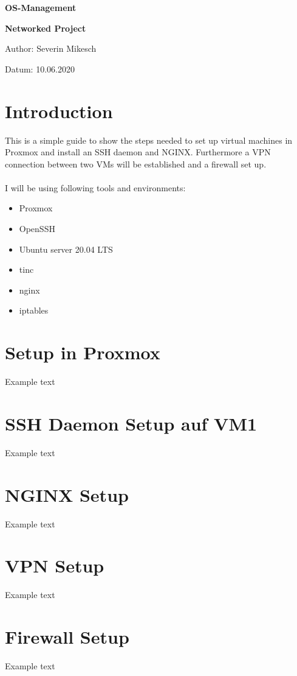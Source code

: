 \documentclass[10pt,a4paper]{article}
\begin{document}
\huge
\begin{center}
{\bf OS-Management}\par
{\bf Networked Project}\par
\vspace{5cm}
\end{center}

\large
Author: Severin Mikesch\par
\vspace{0.8cm}
Datum: 10.06.2020\par
\vspace{0.8cm}

\normalsize


\newpage
\section{Introduction}
This is a simple guide to show the steps needed to set up virtual machines in Proxmox and install an SSH daemon and NGINX. Furthermore a VPN connection between two VMs will be established and a firewall set up.
\\\\
I will be using following tools and environments:
\begin{itemize}
\item Proxmox
\item OpenSSH
\item Ubuntu server 20.04 LTS
\item tinc
\item nginx
\item iptables
\end{itemize}

\newpage
\section{Setup in Proxmox}
Example text

\newpage
\section{SSH Daemon Setup auf VM1}
Example text

\newpage
\section{NGINX Setup}
Example text

\newpage
\section{VPN Setup}
Example text

\newpage
\section{Firewall Setup}
Example text
\end{document}
